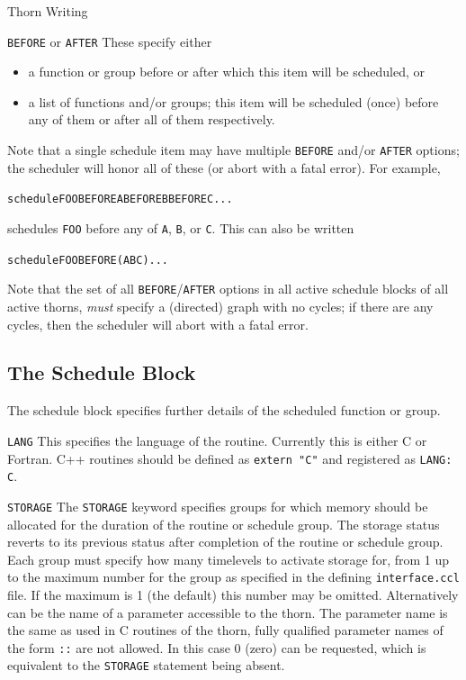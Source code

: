 \begin{cactuspart}{Thorn Writing}
\begin{Lentry}
\item[\texttt{BEFORE} or \texttt{AFTER}]
These specify either
\begin{itemize}
\item   a function or group before or after which this item will be
        scheduled, or
\item   a list of functions and/or groups; this item will be scheduled
        (once) before any of them or after all of them respectively.
\end{itemize}
Note that a single schedule item may have multiple \texttt{BEFORE}
and/or \texttt{AFTER} options; the scheduler will honor all of these
(or abort with a fatal error).  For example,
\begin{alltt}
schedule FOO BEFORE A BEFORE B BEFORE C ...
\end{alltt}
schedules \texttt{FOO} before any of \texttt{A}, \texttt{B}, or \texttt{C}.
This can also be written
\begin{alltt}
schedule FOO BEFORE (A B C) ...
\end{alltt}

Note that the set of all \texttt{BEFORE}/\texttt{AFTER} options in
all active schedule blocks of all active thorns, \emph{must} specify
a (directed) graph with no cycles; if there are any cycles, then the
scheduler will abort with a fatal error.
\end{Lentry}


\subsection{The Schedule Block}
\label{scheduling:schedule_block}

The schedule block specifies further details of the scheduled function
or group.

\begin{Lentry}
\item[\texttt{LANG}]
This specifies the language of the routine.  Currently this is either
C or Fortran. C++ routines should be defined as \texttt{extern "C"}
and registered as \texttt{LANG: C}.
\item[\texttt{STORAGE}] The \texttt{STORAGE} keyword specifies groups for
which memory should be allocated for the duration of the routine or
schedule group.  The storage status reverts to its previous status
after completion of the routine or schedule group.
Each group must specify how many timelevels to activate storage for,
from 1 up to the maximum number for the group as specified in the
defining {\tt interface.ccl} file. If the maximum is 1 (the default)
this number may be omitted. Alternatively  can be the
name of a parameter accessible to the thorn. The parameter name is the
same as used in C routines of the thorn, fully qualified parameter names
of the form \texttt{::} are not allowed. In this
case 0 (zero)  can be requested, which is equivalent to
the {\tt STORAGE} statement being absent.


\end{Lentry}
\end{cactuspart}

